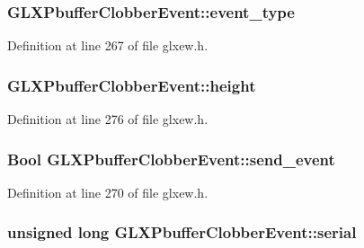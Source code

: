 \subsubsection[{event\+\_\+type}]{ G\+L\+X\+Pbuffer\+Clobber\+Event\+::event\+\_\+type}\label{struct_g_l_x_pbuffer_clobber_event_a30d7162d8d77246b01f5e610cda4da68}


Definition at line 267 of file glxew.\+h.

\hypertarget{struct_g_l_x_pbuffer_clobber_event_aed4e539c896bdad15217bf92c28f8520}{}
\subsubsection[{height}]{ G\+L\+X\+Pbuffer\+Clobber\+Event\+::height}\label{struct_g_l_x_pbuffer_clobber_event_aed4e539c896bdad15217bf92c28f8520}


Definition at line 276 of file glxew.\+h.

\hypertarget{struct_g_l_x_pbuffer_clobber_event_aa51969e67e4ad6095bda26ca64fe8ba6}{}
\subsubsection[{send\+\_\+event}]{\setlength{\rightskip}{0pt plus 5cm}Bool G\+L\+X\+Pbuffer\+Clobber\+Event\+::send\+\_\+event}\label{struct_g_l_x_pbuffer_clobber_event_aa51969e67e4ad6095bda26ca64fe8ba6}


Definition at line 270 of file glxew.\+h.

\hypertarget{struct_g_l_x_pbuffer_clobber_event_a6390b2875ae06a4cb827d2b4c321eda3}{}
\subsubsection[{serial}]{\setlength{\rightskip}{0pt plus 5cm}unsigned long G\+L\+X\+Pbuffer\+Clobber\+Event\+::serial}\label{struct_g_l_x_pbuffer_clobber_event_a6390b2875ae06a4cb827d2b4c321eda3}


